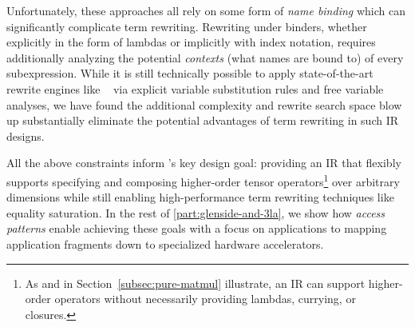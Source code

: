 Unfortunately, these approaches all rely on some
  form of \textit{name binding} which can
  significantly complicate term rewriting.
Rewriting under binders,
  whether explicitly in the form of lambdas
  or implicitly with index notation,
  requires additionally analyzing the
  potential \textit{contexts}
  (what names are bound to)
  of every subexpression.
While it is still technically possible to
  apply state-of-the-art rewrite engines
  like ~\cite{willsey2021egg}
  via explicit variable substitution rules and
  free variable analyses,
  we have found the additional complexity
  and rewrite search space blow up
  substantially eliminate the potential advantages
  of term rewriting in such IR designs.

All the above constraints inform \g's key design goal:
  providing an IR that flexibly supports specifying and
  composing higher-order tensor operators\footnote{
    As  and  in 
    Section~\ref{subsec:pure-matmul} illustrate,
    an IR can support higher-order operators without
    necessarily providing lambdas, currying, or closures.}
  over arbitrary dimensions while still enabling
  high-performance term rewriting techniques
  like equality saturation.
In the rest of \cref{part:glenside-and-3la},
  we show how \textit{access patterns} enable achieving
  these goals with a focus on applications to
  mapping application fragments down to
  specialized hardware accelerators.


  








